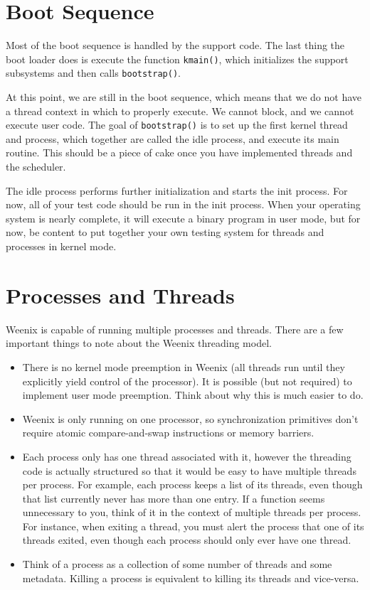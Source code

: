 \section{Boot Sequence}

Most of the boot sequence is handled by the support code. The last thing the boot loader does is execute the function \texttt{kmain()}, which initializes the support subsystems and then calls \texttt{bootstrap()}.

At this point, we are still in the boot sequence, which means that we do not have a thread context in which to properly execute. We cannot block, and we cannot execute user code. The goal of \texttt{bootstrap()} is to set up the first kernel thread and process, which together are called the idle process, and execute its main routine. This should be a piece of cake once you have implemented threads and the scheduler.

The idle process performs further initialization and starts the init process. For now, all of your test code should be run in the init process. When your operating system is nearly complete, it will execute a binary program in user mode, but for now, be content to put together your own testing system for threads and processes in kernel mode.

\section{Processes and Threads}

Weenix is capable of running multiple processes and threads. There are a few important things to note about the Weenix threading model.
\begin{itemize}
    \item There is no kernel mode preemption in Weenix (all threads run until they explicitly yield control of the processor). It is possible (but not required) to implement user mode preemption. Think about why this is much easier to do.
    \item Weenix is only running on one processor, so synchronization primitives don't require atomic compare-and-swap instructions or memory barriers.
    \item Each process only has one thread associated with it, however the threading code is actually structured so that it would be easy to have multiple threads per process. For example, each process keeps a list of its threads, even though that list currently never has more than one entry. If a function seems unnecessary to you, think of it in the context of multiple threads per process. For instance, when exiting a thread, you must alert the process that one of its threads exited, even though each process should only ever have one thread.
     \item Think of a process as a collection of some number of threads and some metadata. Killing a process is equivalent to killing its threads and vice-versa.
\end{itemize}

